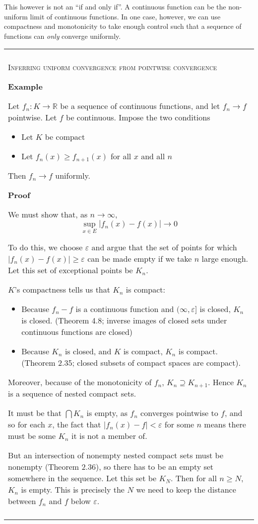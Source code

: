 \documentclass{article}
\newenvironment{myboxed}{\bigskip\noindent\begin{tabular}{|p{.975\linewidth}|}\hline \\}{\\\\\hline\end{tabular}\bigskip}
\begin{document}
This however is not an ``if and only if''. A continuous function can be the non-uniform limit of continuous functions. In one case, however, we can use compactness and monotonicity to take enough control such that a sequence of functions can \textit{only} converge uniformly.

\begin{myboxed}
    \textsc{Inferring uniform convergence from pointwise convergence}

    \textbf{Example}
    
    Let $f_n: K \rightarrow \mathbb{R}$ be a sequence of continuous functions, and let $f_n \rightarrow f$ pointwise. Let $f$ be continuous. Impose the two conditions
    \begin{itemize}
        \item Let $K$ be compact
        \item Let $f_n(x) \geq f_{n+1}(x)$ for all $x$ and all $n$
    \end{itemize}
    Then $f_n \rightarrow f$ uniformly.

    \textbf{Proof}

    We must show that, as $n \rightarrow \infty$,
    \[\sup_{x \in E}|f_n(x) - f(x)| \rightarrow 0\]

    To do this, we choose $\varepsilon$ and argue that the set of points for which $|f_n(x) - f(x)| \geq \varepsilon$ can be made empty if we take $n$ large enough. Let this set of exceptional points be $K_n$.


    $K$'s compactness tells us that $K_n$ is compact:
    \begin{itemize}
        \item Because $f_n - f$ is a continuous function and $(\infty, \varepsilon]$ is closed, $K_n$ is closed. (Theorem 4.8; inverse images of closed sets under continuous functions are closed) 
        \item Because $K_n$ is closed, and $K$ is compact, $K_n$ is compact. (Theorem 2.35; closed subsets of compact spaces are compact).
    \end{itemize}

    Moreover, because of the monotonicity of $f_n$, $K_n \supseteq K_{n+1}$. Hence $K_n$ is a sequence of nested compact sets.

    It must be that $\bigcap K_n$ is empty, as $f_n$ converges pointwise to $f$, and so for each $x$, the fact that $|f_n(x) - f| < \varepsilon$ for some $n$ means there must be some $K_n$ it is not a member of.

    But an intersection of nonempty nested compact sets must be nonempty (Theorem 2.36), so there has to be an empty set somewhere in the sequence. Let this set be $K_N$. Then for all $n \geq N$, $K_n$ is empty. This is precisely the $N$ we need to keep the distance between $f_n$ and $f$ below $\varepsilon$.
\end{myboxed}
\end{document}
